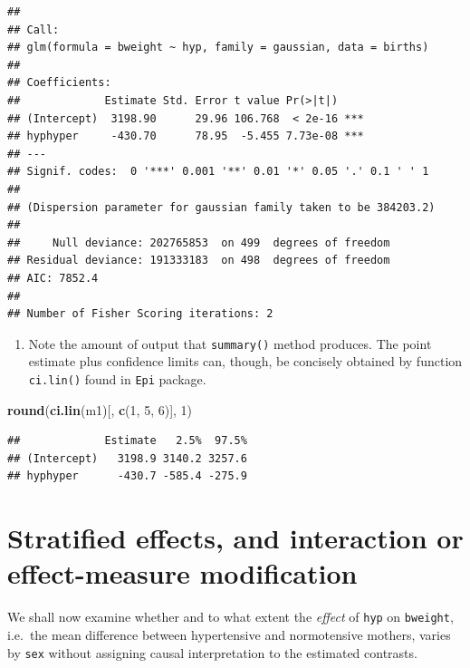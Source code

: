 \documentclass[
]{book}
\newenvironment{Shaded}{\begin{snugshade}}{\end{snugshade}}
\newcommand{\DecValTok}[1]{\textcolor[rgb]{0.00,0.00,0.81}{#1}}
\newcommand{\FunctionTok}[1]{\textcolor[rgb]{0.13,0.29,0.53}{\textbf{#1}}}
\newcommand{\NormalTok}[1]{#1}
\providecommand{\tightlist}{%
  \setlength{\itemsep}{0pt}\setlength{\parskip}{0pt}}
\begin{document}
\begin{verbatim}
## 
## Call:
## glm(formula = bweight ~ hyp, family = gaussian, data = births)
## 
## Coefficients:
##             Estimate Std. Error t value Pr(>|t|)    
## (Intercept)  3198.90      29.96 106.768  < 2e-16 ***
## hyphyper     -430.70      78.95  -5.455 7.73e-08 ***
## ---
## Signif. codes:  0 '***' 0.001 '**' 0.01 '*' 0.05 '.' 0.1 ' ' 1
## 
## (Dispersion parameter for gaussian family taken to be 384203.2)
## 
##     Null deviance: 202765853  on 499  degrees of freedom
## Residual deviance: 191333183  on 498  degrees of freedom
## AIC: 7852.4
## 
## Number of Fisher Scoring iterations: 2
\end{verbatim}

\begin{enumerate}
\def\labelenumi{\arabic{enumi}.}
\setcounter{enumi}{2}
\tightlist
\item
  Note the amount of output that \texttt{summary()} method produces.
  The point estimate plus confidence limits can, though, be concisely obtained by function \texttt{ci.lin()} found in \texttt{Epi} package.
\end{enumerate}

\begin{Shaded}
\begin{Highlighting}[]
\FunctionTok{round}\NormalTok{(}\FunctionTok{ci.lin}\NormalTok{(m1)[, }\FunctionTok{c}\NormalTok{(}\DecValTok{1}\NormalTok{, }\DecValTok{5}\NormalTok{, }\DecValTok{6}\NormalTok{)], }\DecValTok{1}\NormalTok{)}
\end{Highlighting}
\end{Shaded}

\begin{verbatim}
##             Estimate   2.5%  97.5%
## (Intercept)   3198.9 3140.2 3257.6
## hyphyper      -430.7 -585.4 -275.9
\end{verbatim}

\section{Stratified effects, and interaction or effect-measure modification}\label{stratified-effects-and-interaction-or-effect-measure-modification}

We shall now examine whether and to what extent the
\emph{effect} of \texttt{hyp} on \texttt{bweight}, i.e.~the
mean difference between hypertensive and normotensive mothers,
varies by \texttt{sex} without assigning
causal interpretation to the estimated contrasts.
\end{document}
